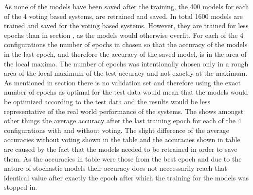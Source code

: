 As none of the models have been saved after the training, the 400 models for each of the 4 voting based systems, are retrained and saved. In total 1600 models are trained and saved for the voting based systems. However, they are trained for less epochs than in section , as the models would otherwise overfit. For each of the 4 configurations the number of epochs in chosen so that the accuracy of the models in the last epoch, and therefore the accuracy of the saved model, is in the area of the local maxima. The number of epochs was intentionally chosen only in a rough area of the local maximum of the test accuracy and not exactly at the maximum. As mentioned in section  there is no validation set and therefore using the exact number of epochs as optimal for the test data would mean that the models would be optimized according to the test data and the results would be less representative of the real world performance of the systems. The  shows amongst other things the average accuracy after the last training epoch for each of the 4 configurations with and without voting. The slight difference of the average accuracies without voting shown in the table and the accuracies shown in table  are caused by the fact that the models needed to be retrained in order to save them. As the accuracies in table  were those from the best epoch and due to the nature of stochastic models their accuracy does not neccessarily reach that identical value after exactly the epoch after which the training for the models was stopped in. 

\begin{table}[H]
	\centering
	\caption{add caption.}%
\end{table}

